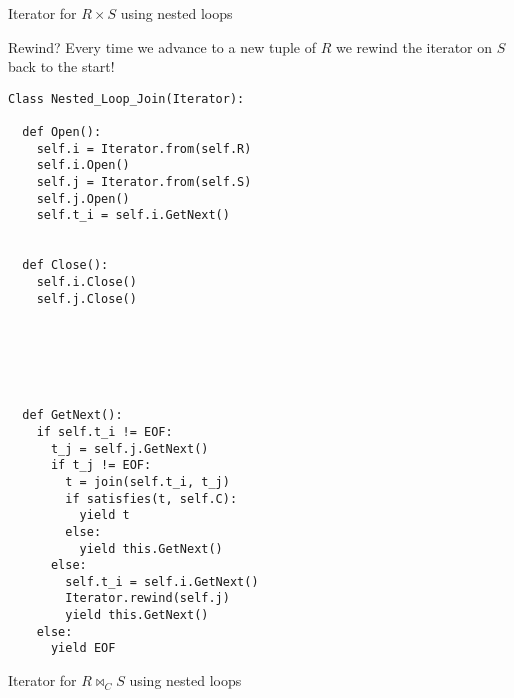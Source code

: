 \begin{frame}[fragile]{Iterator for $R \times S$ using nested loops}
\label{cross_product_iterator}

\hspace*{-1.5em}\usebox\CrossProductIterator

\begin{block}{Rewind?}
Every time we advance to a new tuple of $R$ we rewind the iterator on $S$ back to the start!
\end{block}

\end{frame}


%
%

\newsavebox\NLJoinIterator
\begin{lrbox}{\NLJoinIterator}
\begin{minipage}{\textwidth}
\begin{lstlisting}[style=Python,multicols=2]
Class Nested_Loop_Join(Iterator):

  def Open():
    self.i = Iterator.from(self.R)
    self.i.Open()
    self.j = Iterator.from(self.S)
    self.j.Open()
    self.t_i = self.i.GetNext()


  def Close():
    self.i.Close()
    self.j.Close()






  def GetNext():
    if self.t_i != EOF:
      t_j = self.j.GetNext()
      if t_j != EOF:
        t = join(self.t_i, t_j)
        if satisfies(t, self.C):
          yield t
        else:
          yield this.GetNext()  
      else:
        self.t_i = self.i.GetNext()
        Iterator.rewind(self.j)
        yield this.GetNext()
    else:
      yield EOF
\end{lstlisting}
\end{minipage}
\end{lrbox}

\begin{frame}[fragile]{Iterator for $R \Join_C S$ using nested loops}
\label{nested_loop_join_iterator}

\usebox\NLJoinIterator


\end{frame}


